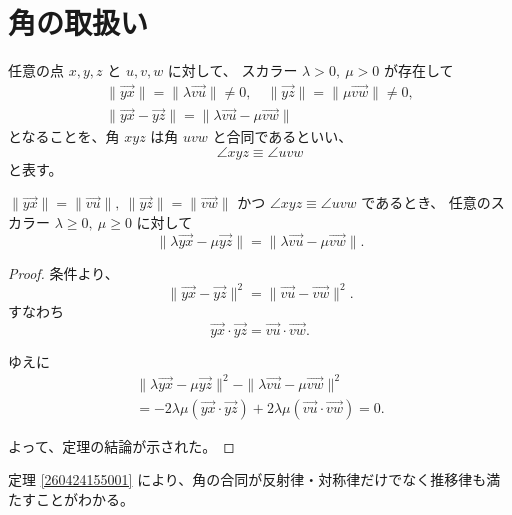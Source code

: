 
\section{角の取扱い}


\begin{dfn}
  任意の点 \(x,y,z\) と \(u,v,w\) に対して、
  スカラー \(\lambda>0,\ \mu>0\) が存在して
  \begin{gather*}
    \|\overrightarrow{yx}\|=\|\lambda\overrightarrow{vu}\|\neq 0,\quad\|\overrightarrow{yz}\|=\|\mu\overrightarrow{vw}\|\neq 0, \\
    \|\overrightarrow{yx}-\overrightarrow{yz}\|=\|\lambda\overrightarrow{vu}-\mu\overrightarrow{vw}\|
  \end{gather*}
  となることを、角 \(xyz\) は角 \(uvw\) と合同であるといい、
  \[\angle xyz\equiv\angle uvw\]
  と表す。
\end{dfn}


\begin{thm}\label{260424155001}
  \(\|\overrightarrow{yx}\|=\|\overrightarrow{vu}\|,\ \|\overrightarrow{yz}\|=\|\overrightarrow{vw}\|\) かつ \(\angle xyz\equiv\angle uvw\) であるとき、
  任意のスカラー \(\lambda\geq 0,\ \mu\geq 0\) に対して
  \[\|\lambda\overrightarrow{yx}-\mu\overrightarrow{yz}\|=\|\lambda\overrightarrow{vu}-\mu\overrightarrow{vw}\|.\]
\end{thm}

\begin{proof}
  条件より、
  \[\|\overrightarrow{yx}-\overrightarrow{yz}\|^2=\|\overrightarrow{vu}-\overrightarrow{vw}\|^2.\]
  すなわち
  \[\overrightarrow{yx}\cdot\overrightarrow{yz}=\overrightarrow{vu}\cdot\overrightarrow{vw}.\]

  ゆえに
  \begin{gather*}
    \|\lambda\overrightarrow{yx}-\mu\overrightarrow{yz}\|^2-\|\lambda\overrightarrow{vu}-\mu\overrightarrow{vw}\|^2 \\
    =-2\lambda\mu(\overrightarrow{yx}\cdot\overrightarrow{yz})+2\lambda\mu(\overrightarrow{vu}\cdot\overrightarrow{vw})=0.
  \end{gather*}

  よって、定理の結論が示された。
\end{proof}

\begin{col*}
  定理 \ref{260424155001} により、角の合同が反射律・対称律だけでなく推移律も満たすことがわかる。
\end{col*}

